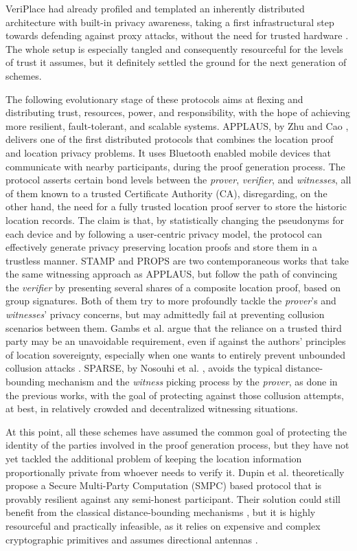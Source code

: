 VeriPlace had already profiled and templated an inherently distributed architecture with built-in privacy awareness, taking a first infrastructural step towards defending against proxy attacks, without the need for trusted hardware \cite{luo2010veriplace}. The whole setup is especially tangled and consequently resourceful for the levels of trust it assumes, but it definitely settled the ground for the next generation of \pol{} schemes. 

The following evolutionary stage of these protocols aims at flexing and distributing trust, resources, power, and responsibility, with the hope of achieving more resilient, fault-tolerant, and scalable systems. APPLAUS, by Zhu and Cao \cite{zhu2011applaus}, delivers one of the first distributed protocols that combines the location proof and location privacy problems. It uses Bluetooth enabled mobile devices that communicate with nearby participants, during the proof generation process. The protocol asserts certain bond levels between the \emph{prover}, \emph{verifier}, and \emph{witnesses}, all of them known to a trusted Certificate Authority (CA), disregarding, on the other hand, the need for a fully trusted location proof server to store the historic location records. The claim is that, by statistically changing the pseudonyms for each device and by following a user-centric privacy model, the protocol can effectively generate privacy preserving location proofs and store them in a trustless manner. STAMP \cite{wang2016stamp} and PROPS \cite{gambs2014props} are two contemporaneous works that take the same witnessing approach as APPLAUS, but follow the path of convincing the \emph{verifier} by presenting several shares of a composite location proof, based on group signatures. Both of them try to more profoundly tackle the \emph{prover}'s and \emph{witnesses}' privacy concerns, but may admittedly fail at preventing collusion scenarios between them. Gambs et al. argue that the reliance on a trusted third party may be an unavoidable requirement, even if against the authors' principles of location sovereignty, especially when one wants to entirely prevent unbounded collusion attacks \cite{gambs2014props}. SPARSE, by Nosouhi et al. \cite{nosouhi2018sparse}, avoids the typical distance-bounding mechanism and the \emph{witness} picking process by the \emph{prover}, as done in the previous works, with the goal of protecting against those collusion attempts, at best, in relatively crowded and decentralized witnessing situations. 

At this point, all these schemes have assumed the common goal of protecting the identity of the parties involved in the proof generation process, but they have not yet tackled the additional problem of keeping the location information proportionally private from whoever needs to verify it. Dupin et al. \cite{dupin2018location} theoretically propose a Secure Multi-Party Computation (SMPC) based protocol that is provably resilient against any semi-honest participant. Their solution could still benefit from the classical distance-bounding mechanisms \cite{dupin2018location}, but it is highly resourceful and practically infeasible, as it relies on expensive and complex cryptographic primitives and assumes directional antennas \cite{yang2021group}.

